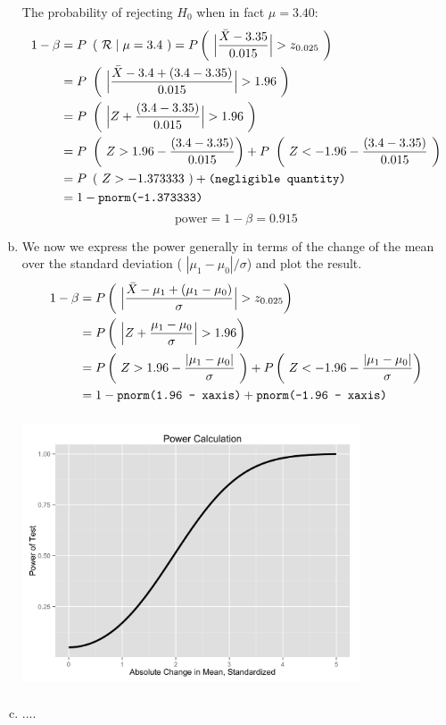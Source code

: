 \documentclass[12pt]{article}
\begin{document}
\begin{enumerate}[(a)]
The probability of rejecting $H_0$ when in fact $\mu = 3.40$:
\begin{align*}
1 - \beta &= P\ \left( \ \mathcal{R} \mid \mu = 3.4 \ \right) = P \left( \ \Big| \frac{\bar X - 3.35}{0.015} \Big| > z_{0.025} \ \right)\\
&= P \ \left( \ \Big| \frac{\bar X - 3.4 + (3.4 - 3.35)}{0.015} \Big| > 1.96 \ \right) \\
&= P \ \left( \ \Big| Z +\frac{(3.4 - 3.35)}{0.015} \Big| > 1.96 \ \right) \\
&= P \ \left( \ Z > 1.96 - \frac{(3.4 - 3.35)}{0.015} \right) + P \ \left( \ Z < -1.96 - \frac{(3.4 - 3.35)}{0.015} \ \right) \\
&= P \ \left( \ Z > -1.373333 \ \right) + \text{\texttt{(negligible quantity)}} \\
&= 1 -  \text{\texttt{pnorm(-1.373333)}}
\end{align*}
$$
\boxed{\text{power}  = 1 - \beta  = 0.915}
$$

\item We now we express the power generally in terms of the change of the mean over the standard deviation ( $ | \mu_1 - \mu_0 | / \sigma$) and plot the result.
\begin{align*}
1 - \beta &= P \left( \ \Big| \frac{\bar X - \mu_1 + (\mu_1 - \mu_0)}{\sigma} \Big| > z_{0.025} \right) \\
&= P \left( \ \Big|  Z +  \frac{\mu_1 - \mu_0} {\sigma}  \Big| >  1.96 \right) \\
&= P \left( \ Z > 1.96 -  \frac{ | \mu_1 - \mu_0 | } {\sigma}  \ \right)  + P \left( \ Z < -1.96 -  \frac{ | \mu_1 - \mu_0 | } {\sigma}  \right)  \\
&= 1 -  \text{\texttt{pnorm(1.96 - xaxis)}} + \text{\texttt{pnorm(-1.96 - xaxis)}} \\
\end{align*}

\begin{center}
\includegraphics[width=10cm, height=8cm, width= 10cm]{power_plot_2c}
\end{center} 

\item ....

\end{enumerate}
\end{document}
